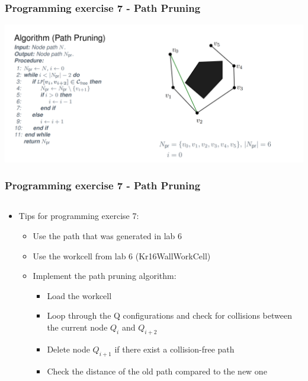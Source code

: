 \documentclass{beamer}
\begin{document}
\begin{frame}
 \frametitle{Programming exercise 7 - Path Pruning}
	\begin{center}
        \includegraphics[width=\textwidth]{./path_pruning}
      \end{center}
\end{frame}



\begin{frame}
 \frametitle{Programming exercise 7 - Path Pruning}
  \begin{columns}
    \begin{column}{1\textwidth}
      \begin{itemize}
      \item Tips for programming exercise 7:
       \begin{itemize}
       \item Use the path that was generated in lab 6
       \item Use the workcell from lab 6 (Kr16WallWorkCell)
       \item Implement the path pruning algorithm:
       \begin{itemize}
        \item Load the workcell
        \item Loop through the Q configurations and check for collisions between the current node $Q_i$ and $Q_{i+2}$
        \item Delete node $Q_{i+1}$ if there exist a collision-free path
        \item Check the distance of the old path compared to the new one
       \end{itemize}
       \end{itemize}
      \end{itemize}
    \end{column}
  \end{columns}
\end{frame}
\end{document}
